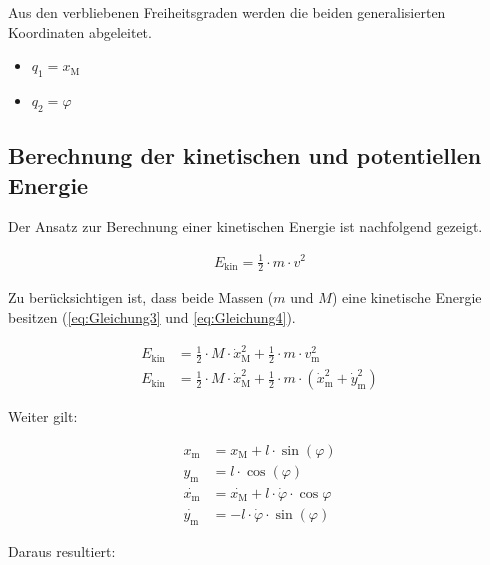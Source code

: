 Aus den verbliebenen Freiheitsgraden werden die beiden generalisierten Koordinaten abgeleitet.

\begin{itemize}
    \item $q_{\mathrm{1}} = x_{\mathrm{M}}$
    \item $q_{\mathrm{2}} = \varphi$
\end{itemize}

\subsection{Berechnung der kinetischen und potentiellen Energie}

Der Ansatz zur Berechnung einer kinetischen Energie ist nachfolgend gezeigt.

\begin{align}\label{eq:Gleichung2}
    E_{\mathrm{kin}} = \frac{1}{2} \cdot m \cdot v^2
\end{align}

Zu berücksichtigen ist, dass beide Massen ($m$ und $M$) eine kinetische Energie besitzen (\autoref{eq:Gleichung3} und \autoref{eq:Gleichung4}).

\begin{align}
    E_{\mathrm{kin}} &= \frac{1}{2} \cdot M \cdot \dot{x}_{\mathrm{M}}^2 + \frac{1}{2} \cdot m \cdot v_{\mathrm{m}}^2 \label{eq:Gleichung3} \\
    E_{\mathrm{kin}} &= \frac{1}{2} \cdot M \cdot \dot{x}_{\mathrm{M}}^2 + \frac{1}{2} \cdot m \cdot \left(\dot{x}_{\mathrm{m}}^2 + \dot{y}_{\mathrm{m}}^2\right) \label{eq:Gleichung4}
\end{align}

Weiter gilt:

\begin{align*}
    x_{\mathrm{m}} &= x_{\mathrm{M}} + l \cdot \sin({\varphi}) \\
    y_{\mathrm{m}} &= l \cdot \cos({\varphi}) \\
    \dot{x_{\mathrm{m}}} &= \dot{x_{\mathrm{M}}} + l \cdot \dot{\varphi} \cdot \cos{\varphi} \\
    \dot{y_{\mathrm{m}}} &= -l \cdot \dot{\varphi} \cdot \sin({\varphi})
\end{align*}

Daraus resultiert:

